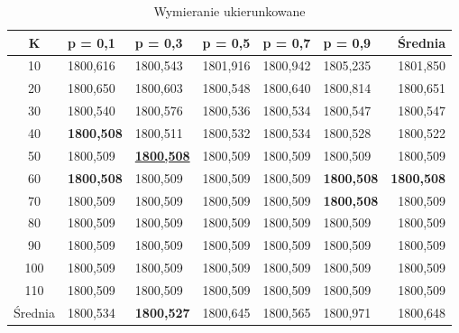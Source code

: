 \documentclass[10pt]{article}
\begin{document}
\begin{table}[H]
\begin{subtable}{\textwidth}
\centering
\begin{tabularx}{0.8\textwidth}{c||X|X|X|X|X||r}
\hline
K & p = 0,1 & p = 0,3 & p = 0,5 & p = 0,7 & p = 0,9 & Średnia \\
\hline \hline
10 & 1800,616 & 1800,543 & 1801,916 & 1800,942 & 1805,235 & 1801,850 \\
20 & 1800,650 & 1800,603 & 1800,548 & 1800,640 & 1800,814 & 1800,651 \\
30 & 1800,540 & 1800,576 & 1800,536 & 1800,534 & 1800,547 & 1800,547 \\
40 & \textbf{1800,508} & 1800,511 & 1800,532 & 1800,534 & 1800,528 & 1800,522 \\
50 & 1800,509 & \underline{\textbf{1800,508}} & 1800,509 & 1800,509 & 1800,509 & 1800,509 \\
60 & \textbf{1800,508} & 1800,509 & 1800,509 & 1800,509 & \textbf{1800,508} & \textbf{1800,508} \\
70 & 1800,509 & 1800,509 & 1800,509 & 1800,509 & \textbf{1800,508} & 1800,509 \\
80 & 1800,509 & 1800,509 & 1800,509 & 1800,509 & 1800,509 & 1800,509 \\
90 & 1800,509 & 1800,509 & 1800,509 & 1800,509 & 1800,509 & 1800,509 \\
100 & 1800,509 & 1800,509 & 1800,509 & 1800,509 & 1800,509 & 1800,509 \\
110 & 1800,509 & 1800,509 & 1800,509 & 1800,509 & 1800,509 & 1800,509 \\
\hline
Średnia & 1800,534 & \textbf{1800,527} & 1800,645 & 1800,565 & 1800,971 & 1800,648 \\
\hline
\end{tabularx}
\caption{Wymieranie ukierunkowane}
\end{subtable}
\end{table}
\end{document}
